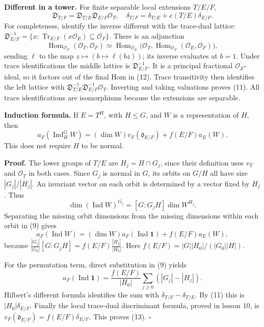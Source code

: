 \documentclass[11pt,a4paper]{article}
\begin{document}
\textbf{Different in a tower.} For finite separable local extensions
\(T/E/F\), \[
\mathfrak D_{T/F}=\mathfrak D_{T/E}\mathfrak D_{E/F}\mathcal O_T,
\quad \delta_{T/F}=\delta_{T/E}+e(T/E)\delta_{E/F}.
\tag{11}
\] For completeness, identify the inverse different with the trace-dual
lattice:
\(\mathfrak D_{E/F}^{-1}=\{x:\operatorname{Tr}_{E/F}(x\mathcal O_E)\subseteq\mathcal O_F\}\).
There is an adjunction \[
\operatorname{Hom}_{\mathcal O_F}(\mathcal O_T,\mathcal O_F)
\simeq
\operatorname{Hom}_{\mathcal O_E}
\bigl(\mathcal O_T,\operatorname{Hom}_{\mathcal O_F}(\mathcal O_E,\mathcal O_F)\bigr),
\tag{12}
\] sending \(\ell\) to the map \(z\mapsto(b\mapsto\ell(bz))\); its
inverse evaluates at \(b=1\). Under trace identifications the middle
lattice is \(\mathfrak D_{E/F}^{-1}\). It is a principal fractional
\(\mathcal O_E\)-ideal, so it factors out of the final Hom in (12).
Trace transitivity then identifies the left lattice with
\(\mathfrak D_{T/E}^{-1}\mathfrak D_{E/F}^{-1}\mathcal O_T\). Inverting
and taking valuations proves (11). All trace identifications are
isomorphisms because the extensions are separable.

\textbf{Induction formula.} If \(E=T^H\), with \(H\leq G\), and \(W\) is
a representation of \(H\), then \[
a_F(\operatorname{Ind}_H^G W)
=(\dim W)v_F(\mathfrak d_{E/F})+f(E/F)a_E(W).
\tag{13}
\] This does not require \(H\) to be normal.

\textbf{Proof.} The lower groups of \(T/E\) are \(H_j=H\cap G_j\), since
their definition uses \(v_T\) and \(\mathcal O_T\) in both cases. Since
\(G_j\) is normal in \(G\), its orbits on \(G/H\) all have size
\(|G_j|/|H_j|\). An invariant vector on each orbit is determined by a
vector fixed by \(H_j\). Thus \[
\dim(\operatorname{Ind}W)^{G_j}=[G:G_jH]\dim W^{H_j}.
\tag{14}
\] Separating the missing orbit dimensions from the missing dimensions
within each orbit in (9) gives \[
a_F(\operatorname{Ind}W)
=(\dim W)a_F(\operatorname{Ind}\mathbf1)
 +f(E/F)a_E(W),
\tag{15}
\] because \(\frac{|G_j|}{|G_0|}[G:G_jH]
=f(E/F)\frac{|H_j|}{|H_0|}\). Here \(f(E/F)=|G||H_0|/(|G_0||H|)\).

For the permutation term, direct substitution in (9) yields \[
a_F(\operatorname{Ind}\mathbf1)
=\frac{f(E/F)}{|H_0|}\sum_{j\geq0}(|G_j|-|H_j|).
\tag{16}
\] Hilbert's different formula identifies the sum with
\(\delta_{T/F}-\delta_{T/E}\). By (11) this is \(|H_0|\delta_{E/F}\).
Finally the local trace-dual discriminant formula, proved in lesson 10,
is \(v_F(\mathfrak d_{E/F})=f(E/F)\delta_{E/F}\). This proves (13).
\(\square\)
\end{document}
